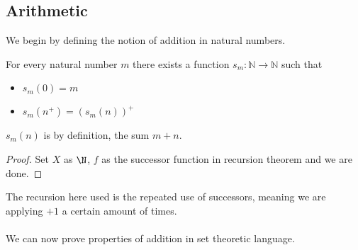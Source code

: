\subsection{Arithmetic}
We begin by defining the notion of addition in natural numbers. 
\begin{prp}{}{} For every natural number $m$ there exists a function $s_m:\mathbb{N}\to\mathbb{N}$ such that
\begin{itemize}
\item $s_m(0)=m$
\item $s_m(n^+)=(s_m(n))^+$
\end{itemize}
$s_m(n)$ is by definition, the sum $m+n$. \tcbline
\begin{proof}
Set $X$ as $\N$, $f$ as the successor function in recursion theorem and we are done. 
\end{proof}
\end{prp}

The recursion here used is the repeated use of successors, meaning we are applying $+1$ a certain amount of times. \\~\\
We can now prove properties of addition in set theoretic language. 

